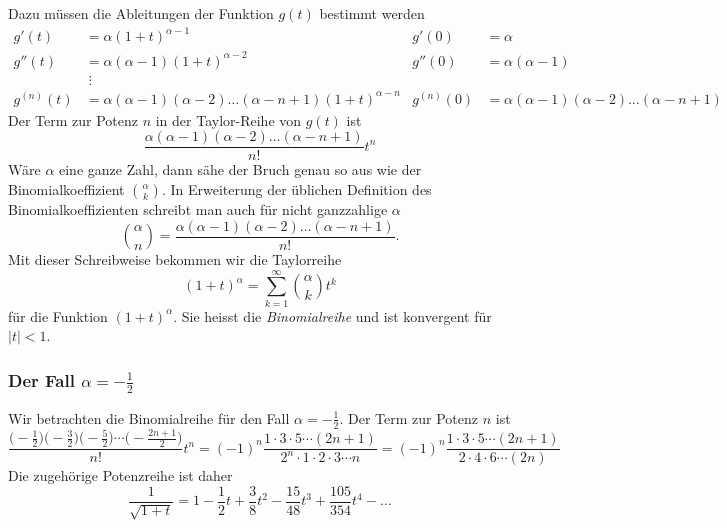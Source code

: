 Dazu müssen die Ableitungen der Funktion $g(t)$ bestimmt werden
\begin{align*}
g'(t)
&=
\alpha(1+t)^{\alpha-1}
&
g'(0)&=\alpha
\\
g''(t)
&=
\alpha(\alpha-1)(1+t)^{\alpha-2}
&
g''(0)&=\alpha(\alpha-1)
\\
&\;\vdots
\\
g^{(n)}(t)
&=
\alpha(\alpha-1)(\alpha-2)\dots(\alpha-n+1) (1+t)^{\alpha -n}
&
g^{(n)}(0)&=\alpha(\alpha-1)(\alpha-2)\dots(\alpha -n +1)
\end{align*}
Der Term zur Potenz $n$ in der Taylor-Reihe von $g(t)$ ist
\[
\frac{\alpha(\alpha-1)(\alpha-2)\dots(\alpha-n+1)}{n!} t^n
\]
Wäre $\alpha$ eine ganze Zahl, dann sähe der Bruch
genau so aus wie der Binomialkoeffizient $\binom{\alpha}{k}$.
In Erweiterung der üblichen Definition des Binomialkoeffizienten
schreibt man auch für nicht ganzzahlige $\alpha$
\[
\binom{\alpha}{n}
=
\frac{\alpha(\alpha-1)(\alpha-2)\dots(\alpha-n+1)}{n!}.
\]
Mit dieser Schreibweise bekommen wir die Taylorreihe
\[
(1+t)^\alpha=\sum_{k=1}^\infty \binom{\alpha}{k} t^k
\]
für die Funktion $(1+t)^\alpha$.
Sie heisst die {\em Binomialreihe} und ist konvergent für $|t|<1$.

\subsubsection{Der Fall $\alpha=-\frac12$}
Wir betrachten die Binomialreihe für den Fall $\alpha=-\frac12$.
Der Term zur Potenz $n$ ist
\begin{equation}
\frac{
\bigl(-\frac12\bigr)
\bigl(-\frac32\bigr)
\bigl(-\frac52\bigr)
\cdots
\bigl(-\frac{2n+1}2\bigr)}{n!} t^n
=
(-1)^n \frac{1\cdot 3\cdot 5 \cdots (2n + 1)}{2^n\cdot 1\cdot 2\cdot 3\cdots n}
=
(-1)^n \frac{1\cdot 3\cdot 5 \cdots (2n+1)}{2\cdot 4\cdot 6\cdots (2n)}
\label{skript:multipol:koeffizienten}
\end{equation}
Die zugehörige Potenzreihe ist daher
\[
\frac1{\sqrt{1+t}}
=
1-\frac12t+\frac3{8}t^2-\frac{15}{48}t^3+\frac{105}{354}t^4-\dots
\]

